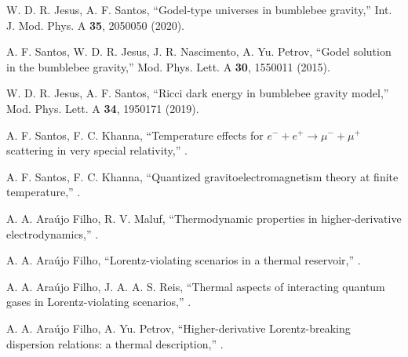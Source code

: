 \documentclass[11pt,showpacs,preprintnumbers,amsmath,amssymb,prd,nofootinbib,superscriptaddress]{revtex4-2}
\begin{document}
\begin{thebibliography}{99}
 W. D. R. Jesus, A. F. Santos, ``Godel-type universes in bumblebee gravity,''  {Int. J. Mod. Phys. A \textbf{35}, 2050050 (2020)}.

 A. F. Santos, W. D. R. Jesus, J. R. Nascimento, A. Yu. Petrov, ``Godel solution in the bumblebee gravity,''  {Mod. Phys. Lett. A \textbf{30}, 1550011 (2015)}.

 W. D. R. Jesus, A. F. Santos, ``Ricci dark energy in bumblebee gravity model,''  {Mod. Phys. Lett. A \textbf{34}, 1950171 (2019)}.

 A. F. Santos, F. C. Khanna, ``Temperature effects for \( e^- + e^+ \rightarrow \mu^- + \mu^+ \) scattering in very special relativity,'' .

 A. F. Santos, F. C. Khanna, ``Quantized gravitoelectromagnetism theory at finite temperature,'' .

 A. A. Ara\'{u}jo Filho, R. V. Maluf, ``Thermodynamic properties in higher-derivative electrodynamics,'' .

 A. A. Ara\'{u}jo Filho, ``Lorentz-violating scenarios in a thermal reservoir,'' .

 A. A. Ara\'{u}jo Filho, J. A. A. S. Reis, ``Thermal aspects of interacting quantum gases in Lorentz-violating scenarios,'' .

 A. A. Ara\'{u}jo Filho, A. Yu. Petrov, ``Higher-derivative Lorentz-breaking dispersion relations: a thermal description,'' .

\end{thebibliography}
\end{document}
